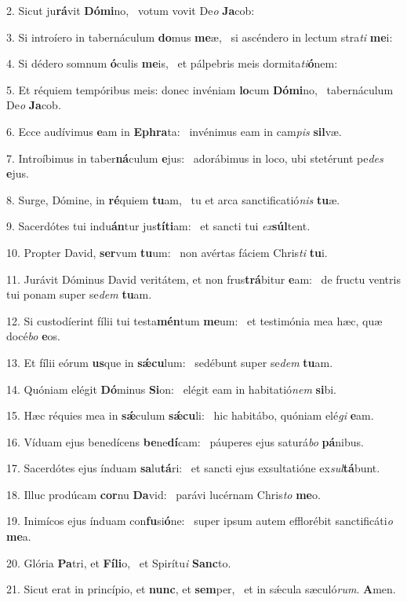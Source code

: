 2. Sicut ju\textbf{rá}vit \textbf{Dó}\textbf{mi}no, \ast\  votum vovit De\textit{o} \textbf{Ja}cob:\

3. Si introíero in tabernáculum \textbf{do}mus \textbf{me}æ, \ast\  si ascéndero in lectum stra\textit{ti} \textbf{me}i:\

4. Si dédero somnum \textbf{ó}culis \textbf{me}is, \ast\  et pálpebris meis dormita\textit{ti}\textbf{ó}nem:\

5. Et réquiem tempóribus meis: donec invéniam \textbf{lo}cum \textbf{Dó}\textbf{mi}no, \ast\  tabernáculum De\textit{o} \textbf{Ja}cob.\

6. Ecce audívimus \textbf{e}am in \textbf{E}\textbf{phra}ta: \ast\  invénimus eam in cam\textit{pis} \textbf{sil}væ.\

7. Introíbimus in taber\textbf{ná}culum \textbf{e}jus: \ast\  adorábimus in loco, ubi stetérunt pe\textit{des} \textbf{e}jus.\

8. Surge, Dómine, in \textbf{ré}quiem \textbf{tu}am, \ast\  tu et arca sanctificatió\textit{nis} \textbf{tu}æ.\

9. Sacerdótes tui indu\textbf{án}tur jus\textbf{tí}\textbf{ti}am: \ast\  et sancti tui \textit{ex}\textbf{súl}tent.\

10. Propter David, \textbf{ser}vum \textbf{tu}um: \ast\  non avértas fáciem Chris\textit{ti} \textbf{tu}i.\

11. Jurávit Dóminus David veritátem, et non frus\textbf{trá}bitur \textbf{e}am: \ast\  de fructu ventris tui ponam super se\textit{dem} \textbf{tu}am.\

12. Si custodíerint fílii tui testa\textbf{mén}tum \textbf{me}um: \ast\  et testimónia mea hæc, quæ docé\textit{bo} \textbf{e}os.\

13. Et fílii eórum \textbf{us}que in \textbf{sǽ}\textbf{cu}lum: \ast\  sedébunt super se\textit{dem} \textbf{tu}am.\

14. Quóniam elégit \textbf{Dó}minus \textbf{Si}on: \ast\  elégit eam in habitatió\textit{nem} \textbf{si}bi.\

15. Hæc réquies mea in \textbf{sǽ}culum \textbf{sǽ}\textbf{cu}li: \ast\  hic habitábo, quóniam elé\textit{gi} \textbf{e}am.\

16. Víduam ejus benedícens \textbf{be}ne\textbf{dí}cam: \ast\  páuperes ejus saturá\textit{bo} \textbf{pá}nibus.\

17. Sacerdótes ejus índuam \textbf{sa}lu\textbf{tá}ri: \ast\  et sancti ejus exsultatióne ex\textit{sul}\textbf{tá}bunt.\

18. Illuc prodúcam \textbf{cor}nu \textbf{Da}vid: \ast\  parávi lucérnam Chris\textit{to} \textbf{me}o.\

19. Inimícos ejus índuam con\textbf{fu}si\textbf{ó}ne: \ast\  super ipsum autem efflorébit sanctificáti\textit{o} \textbf{me}a.\

20. Glória \textbf{Pa}tri, et \textbf{Fí}\textbf{li}o, \ast\  et Spirítu\textit{i} \textbf{Sanc}to.\

21. Sicut erat in princípio, et \textbf{nunc}, et \textbf{sem}per, \ast\  et in sǽcula sæculó\textit{rum}. \textbf{A}men.\

